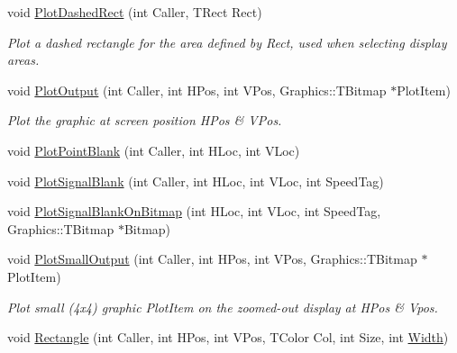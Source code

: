 \begin{DoxyCompactItemize}
\mbox{\label{class_t_display_a09a60665a7a8c7b5d5c705a08086feec}} 
void \mbox{\hyperlink{class_t_display_a09a60665a7a8c7b5d5c705a08086feec}{Plot\+Dashed\+Rect}} (int Caller, T\+Rect Rect)
\begin{DoxyCompactList}\small\item\em Plot a dashed rectangle for the area defined by Rect, used when selecting display areas. \end{DoxyCompactList}\item 
\mbox{\label{class_t_display_a9ab49e52c7eb92b32ae2c34547183439}} 
void \mbox{\hyperlink{class_t_display_a9ab49e52c7eb92b32ae2c34547183439}{Plot\+Output}} (int Caller, int H\+Pos, int V\+Pos, Graphics\+::\+T\+Bitmap $\ast$Plot\+Item)
\begin{DoxyCompactList}\small\item\em Plot the graphic at screen position H\+Pos \& V\+Pos. \end{DoxyCompactList}\item 
void \mbox{\hyperlink{class_t_display_aab35e517eba56f1c95f500958ce431ae}{Plot\+Point\+Blank}} (int Caller, int H\+Loc, int V\+Loc)
\item 
void \mbox{\hyperlink{class_t_display_a69c85bcbafea6cba5f06a93ffae7d3b2}{Plot\+Signal\+Blank}} (int Caller, int H\+Loc, int V\+Loc, int Speed\+Tag)
\item 
void \mbox{\hyperlink{class_t_display_ab6c0da6543f57f83107fd0af371fec3e}{Plot\+Signal\+Blank\+On\+Bitmap}} (int H\+Loc, int V\+Loc, int Speed\+Tag, Graphics\+::\+T\+Bitmap $\ast$Bitmap)
\item 
\mbox{\label{class_t_display_a95aaa80515f0abb7715920b326b318dd}} 
void \mbox{\hyperlink{class_t_display_a95aaa80515f0abb7715920b326b318dd}{Plot\+Small\+Output}} (int Caller, int H\+Pos, int V\+Pos, Graphics\+::\+T\+Bitmap $\ast$Plot\+Item)
\begin{DoxyCompactList}\small\item\em Plot small (4x4) graphic Plot\+Item on the zoomed-\/out display at H\+Pos \& Vpos. \end{DoxyCompactList}\item 
\mbox{\label{class_t_display_a9c7886bf1e4622e8560ad7558ede8dcc}} 
void \mbox{\hyperlink{class_t_display_a9c7886bf1e4622e8560ad7558ede8dcc}{Rectangle}} (int Caller, int H\+Pos, int V\+Pos, T\+Color Col, int Size, int \mbox{\hyperlink{class_t_display_a39cee11613d156de0d1f5df923a02c8d}{Width}})

\end{DoxyCompactItemize}
